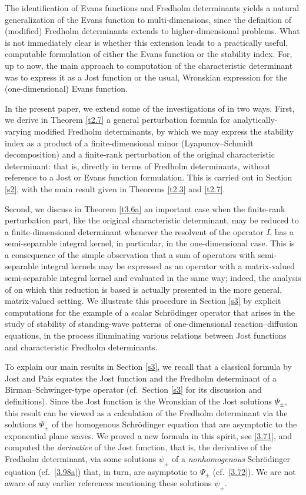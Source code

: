 The identification of Evans functions and Fredholm determinants
yields a natural generalization of the Evans function to multi-dimensions,
since the definition of (modified) Fredholm determinants extends to 
higher-dimensional problems.
What is not immediately clear is whether this extension leads
to a practically useful, computable formulation of either the Evans function
or the stability index.
For, up to now, the main approach to computation of the characteristic
determinant was to express it as a Jost function or the
usual, Wronskian expression for the (one-dimensional) Evans function.

In the present paper, we extend some of the investigations of \cite{GLM07}
in two ways.
First, we derive in Theorem \ref{t2.7} a general perturbation formula
for analytically-varying modified Fredholm determinants,
by which we may express the stability index
as a product of a finite-dimensional minor (Lyapunov--Schmidt
decomposition) and a finite-rank perturbation of the original
characteristic determinant: that is, directly in terms of
Fredholm determinants, without reference to a Jost or Evans
function formulation. This is carried out in Section \ref{s2},
with the main result given in Theorems \ref{t2.3} and \ref{t2.7}.

Second, we discuss in Theorem \ref{t3.6a} an important case when the finite-rank perturbation part, like the original
characteristic determinant, may be reduced to a finite-dimensional
determinant whenever the resolvent of the operator $L$ has a semi-separable
integral kernel, in particular, in the one-dimensional case.
This is a consequence of the simple observation that a
sum of operators with semi-separable integral kernels may be expressed as
an operator with a matrix-valued semi-separable integral kernel and evaluated
in the same way; indeed, the analysis of \cite{GM04} on which this reduction is based
is actually presented in the more general,
matrix-valued setting. 
We illustrate this procedure in Section \ref{s3} by explicit computations
for the example of a scalar Schr\"odinger operator that arises in
the study of stability of standing-wave patterns of
one-dimensional reaction--diffusion equations,
in the process illuminating various relations between Jost functions
and characteristic Fredholm determinants.

To explain our main results in Section \ref{s3}, we recall that a classical formula
by Jost and Pais equates the Jost function and the Fredholm determinant
of a Birman--Schwinger-type operator (cf.\ Section \ref{s3} for
its discussion and definitions).  Since the Jost function is the
Wronskian of the Jost solutions  $\Psi_{\pm}$, this result can
be viewed as a calculation of the Fredholm determinant via the
solutions $\Psi_{\pm}$ of the homogenous Schr\"odinger equation
that are asymptotic to the exponential plane waves.  We proved a
new formula in this spirit, see \eqref{3.71}, and computed the
{\em derivative} of the Jost function, that is, the derivative of the Fredholm determinant, via some solutions $\psi_{\pm}$ of a {\em nonhomogenous} Schr\"odinger equation
(cf.\ \eqref{3.98a}) that, in turn, are asymptotic to $\Psi_{\pm}$ (cf.\ \eqref{3.72}). 
We are not aware of any earlier references mentioning these solutions  $\psi_{\pm}$.

